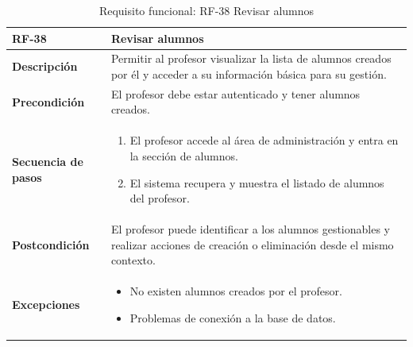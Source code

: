 \begin{table}[H]
\centering
\begin{tabularx}{\textwidth}{
  |>{\centering\arraybackslash}l
  |>{\centering\arraybackslash}X|}
\hline
\textbf{RF-38} & \textbf{Revisar alumnos} \\ \hline
\textbf{Descripción} & Permitir al profesor visualizar la lista de alumnos creados por él y acceder a su información básica para su gestión. \\ \hline
\textbf{Precondición} & El profesor debe estar autenticado y tener alumnos creados. \\ \hline
\textbf{Secuencia de pasos} &
\begin{enumerate}
  \item El profesor accede al área de administración y entra en la sección de alumnos.
  \item El sistema recupera y muestra el listado de alumnos del profesor.
\end{enumerate} \\ \hline
\textbf{Postcondición} & El profesor puede identificar a los alumnos gestionables y realizar acciones de creación o eliminación desde el mismo contexto. \\ \hline
\textbf{Excepciones} &
\begin{itemize}
  \item No existen alumnos creados por el profesor.
  \item Problemas de conexión a la base de datos.
\end{itemize} \\ \hline
\end{tabularx}
\caption{Requisito funcional: RF-38 Revisar alumnos}
\end{table}


